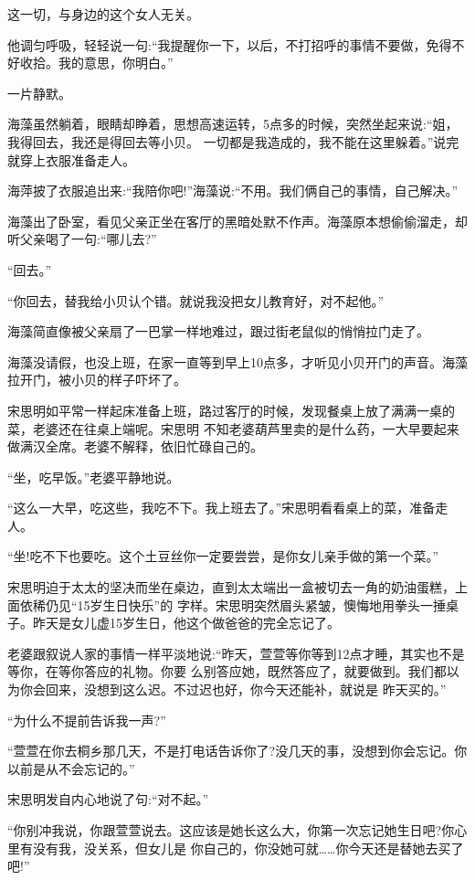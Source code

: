 \documentclass[11pt,a4paper,onecolumn]{article}
\begin{document}
这一切，与身边的这个女人无关。

他调匀呼吸，轻轻说一句:``我提醒你一下，以后，不打招呼的事情不要做，免得不好收拾。我的意思，你明白。''

一片静默。

海藻虽然躺着，眼睛却睁着，思想高速运转，5点多的时候，突然坐起来说:``姐，我得回去，我还是得回去等小贝。
一切都是我造成的，我不能在这里躲着。''说完就穿上衣服准备走人。

海萍披了衣服追出来:``我陪你吧!''海藻说:``不用。我们俩自己的事情，自己解决。''

海藻出了卧室，看见父亲正坐在客厅的黑暗处默不作声。海藻原本想偷偷溜走，却听父亲喝了一句:``哪儿去?''

``回去。''

``你回去，替我给小贝认个错。就说我没把女儿教育好，对不起他。''

海藻简直像被父亲扇了一巴掌一样地难过，跟过街老鼠似的悄悄拉门走了。

海藻没请假，也没上班，在家一直等到早上10点多，才听见小贝开门的声音。海藻拉开门，被小贝的样子吓坏了。

宋思明如平常一样起床准备上班，路过客厅的时候，发现餐桌上放了满满一桌的菜，老婆还在往桌上端呢。宋思明
不知老婆葫芦里卖的是什么药，一大早要起来做满汉全席。老婆不解释，依旧忙碌自己的。

``坐，吃早饭。''老婆平静地说。

``这么一大早，吃这些，我吃不下。我上班去了。''宋思明看看桌上的菜，准备走人。

``坐!吃不下也要吃。这个土豆丝你一定要尝尝，是你女儿亲手做的第一个菜。''

宋思明迫于太太的坚决而坐在桌边，直到太太端出一盒被切去一角的奶油蛋糕，上面依稀仍见``15岁生日快乐''的
字样。宋思明突然眉头紧皱，懊悔地用拳头一捶桌子。昨天是女儿虚15岁生日，他这个做爸爸的完全忘记了。

老婆跟叙说人家的事情一样平淡地说:``昨天，萱萱等你等到12点才睡，其实也不是等你，在等你答应的礼物。你要
么别答应她，既然答应了，就要做到。我们都以为你会回来，没想到这么迟。不过迟也好，你今天还能补，就说是
昨天买的。''

``为什么不提前告诉我一声?''

``萱萱在你去桐乡那几天，不是打电话告诉你了?没几天的事，没想到你会忘记。你以前是从不会忘记的。''

宋思明发自内心地说了句:``对不起。''

``你别冲我说，你跟萱萱说去。这应该是她长这么大，你第一次忘记她生日吧?你心里有没有我，没关系，但女儿是
你自己的，你没她可就……你今天还是替她去买了吧!''
\end{document}
